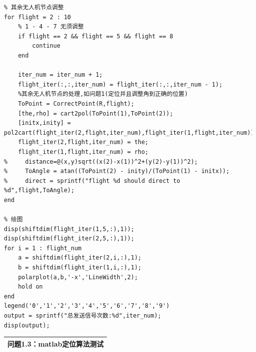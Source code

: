\documentclass{my_paper}
\begin{document}
\begin{lstlisting}
% 其余无人机节点调整
for flight = 2 : 10
    % 1 - 4 - 7 无须调整
    if flight == 2 && flight == 5 && flight == 8
        continue
    end

    iter_num = iter_num + 1;
    flight_iter(:,:,iter_num) = flight_iter(:,:,iter_num - 1);
    %其余无人机节点的处理,如问题1(定位并且调整角到正确的位置)
    ToPoint = CorrectPoint(R,flight);
    [the,rho] = cart2pol(ToPoint(1),ToPoint(2));
    [initx,inity] = pol2cart(flight_iter(2,flight,iter_num),flight_iter(1,flight,iter_num));
    flight_iter(2,flight,iter_num) = the;
    flight_iter(1,flight,iter_num) = rho;
%     distance=@(x,y)sqrt((x(2)-x(1))^2+(y(2)-y(1))^2);
%     ToAngle = atan((ToPoint(2) - inity)/(ToPoint(1) - initx));
%     direct = sprintf("flight %d should direct to %d",flight,ToAngle);
end

% 绘图
disp(shiftdim(flight_iter(1,5,:),1));
disp(shiftdim(flight_iter(2,5,:),1));
for i = 1 : flight_num
    a = shiftdim(flight_iter(2,i,:),1);
    b = shiftdim(flight_iter(1,i,:),1);
    polarplot(a,b,'-x','LineWidth',2);
    hold on
end
legend('0','1','2','3','4','5','6','7','8','9')
output = sprintf("总发送信号次数:%d",iter_num);
disp(output);
\end{lstlisting}

\begin{table}[htbp]
    \centering
    \begin{tabular}{|p{14.0cm}|}
    \hline
    \textbf{问题1.3：matlab定位算法测试} \\ %
    \hline
    \end{tabular}
\end{table}
\end{document}

